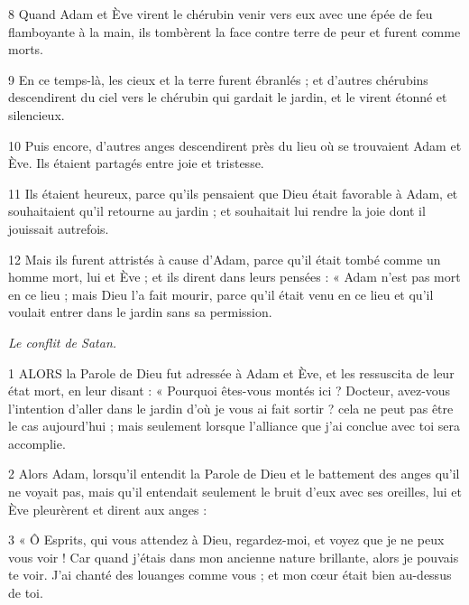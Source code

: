 \par 8 Quand Adam et Ève virent le chérubin venir vers eux avec une épée de feu flamboyante à la main, ils tombèrent la face contre terre de peur et furent comme morts.

\par 9 En ce temps-là, les cieux et la terre furent ébranlés ; et d'autres chérubins descendirent du ciel vers le chérubin qui gardait le jardin, et le virent étonné et silencieux.

\par 10 Puis encore, d'autres anges descendirent près du lieu où se trouvaient Adam et Ève. Ils étaient partagés entre joie et tristesse.

\par 11 Ils étaient heureux, parce qu'ils pensaient que Dieu était favorable à Adam, et souhaitaient qu'il retourne au jardin ; et souhaitait lui rendre la joie dont il jouissait autrefois.

\par 12 Mais ils furent attristés à cause d'Adam, parce qu'il était tombé comme un homme mort, lui et Ève ; et ils dirent dans leurs pensées : « Adam n'est pas mort en ce lieu ; mais Dieu l'a fait mourir, parce qu'il était venu en ce lieu et qu'il voulait entrer dans le jardin sans sa permission.




\par \textit{Le conflit de Satan.}

\par 1 ALORS la Parole de Dieu fut adressée à Adam et Ève, et les ressuscita de leur état mort, en leur disant : « Pourquoi êtes-vous montés ici ? Docteur, avez-vous l'intention d'aller dans le jardin d'où je vous ai fait sortir ? cela ne peut pas être le cas aujourd’hui ; mais seulement lorsque l’alliance que j’ai conclue avec toi sera accomplie.

\par 2 Alors Adam, lorsqu'il entendit la Parole de Dieu et le battement des anges qu'il ne voyait pas, mais qu'il entendait seulement le bruit d'eux avec ses oreilles, lui et Ève pleurèrent et dirent aux anges :

\par 3 « Ô Esprits, qui vous attendez à Dieu, regardez-moi, et voyez que je ne peux vous voir ! Car quand j'étais dans mon ancienne nature brillante, alors je pouvais te voir. J'ai chanté des louanges comme vous ; et mon cœur était bien au-dessus de toi.

